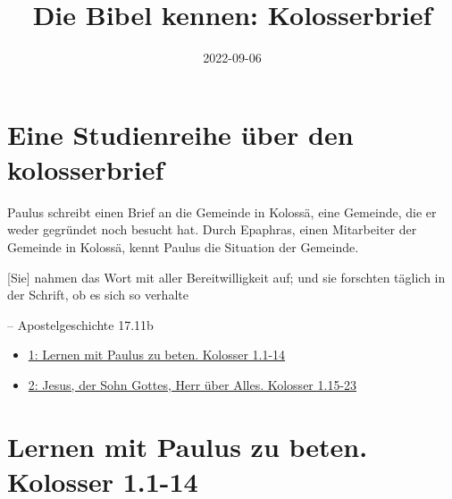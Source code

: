 \documentclass[
  12pt,
]{krantz}
\title{Die Bibel kennen: Kolosserbrief}
\author{}
\date{\vspace{-2.5em}2022-09-06}
\makeatletter
\providecommand{\tightlist}{%
  \setlength{\itemsep}{0pt}\setlength{\parskip}{0pt}}
\newenvironment{kframe}{%
\medskip{}
\setlength{\fboxsep}{.8em}
 \def\at@end@of@kframe{}%
 \ifinner\ifhmode%
  \def\at@end@of@kframe{\end{minipage}}%
  \begin{minipage}{\columnwidth}%
 \fi\fi%
 \def\FrameCommand##1{\hskip\@totalleftmargin \hskip-\fboxsep
 \colorbox{shadecolor}{##1}\hskip-\fboxsep
     \hskip-\linewidth \hskip-\@totalleftmargin \hskip\columnwidth}%
 \MakeFramed {\advance\hsize-\width
   \@totalleftmargin\z@ \linewidth\hsize
   \@setminipage}}%
 {\par\unskip\endMakeFramed%
 \at@end@of@kframe}
\newenvironment{rmdblock}[1]
  {
  \begin{itemize}
  \renewcommand{\labelitemi}{
    \raisebox{-.7\height}[0pt][0pt]{
      {\setkeys{Gin}{width=3em,keepaspectratio}\texttt{[image: img/\#1]}}
    }
  }
  \setlength{\fboxsep}{1em}
  \begin{kframe}
  \item
  }
  {
  \end{kframe}
  \end{itemize}
  }
\newenvironment{rmdquote}
  {\begin{rmdblock}{quote}}
  {\end{rmdblock}}
\makeatother
\begin{document}
\maketitle

\thispagestyle{empty}
\mainmatter

{
\hypersetup{linkcolor=}
\setcounter{tocdepth}{2}
\tableofcontents
}
\hypertarget{eine-studienreihe-uxfcber-den-kolosserbrief}{%
\chapter{Eine Studienreihe über den kolosserbrief}\label{eine-studienreihe-uxfcber-den-kolosserbrief}}

Paulus schreibt einen Brief an die Gemeinde in Kolossä, eine Gemeinde, die
er weder gegründet noch besucht hat. Durch Epaphras, einen Mitarbeiter der
Gemeinde in Kolossä, kennt Paulus die Situation der Gemeinde.

\begin{rmdquote}
{[}Sie{]} nahmen das Wort mit aller Bereitwilligkeit auf; und sie
forschten täglich in der Schrift, ob es sich so verhalte

-- Apostelgeschichte 17.11b
\end{rmdquote}

\begin{itemize}
\tightlist
\item
  \protect\hyperlink{teil_01}{1: Lernen mit Paulus zu beten. Kolosser 1.1-14}
\item
  \protect\hyperlink{teil_02}{2: Jesus, der Sohn Gottes, Herr über Alles. Kolosser 1.15-23}
\end{itemize}

\hypertarget{teil_01}{%
\chapter{Lernen mit Paulus zu beten. Kolosser 1.1-14}\label{teil_01}}
\end{document}
